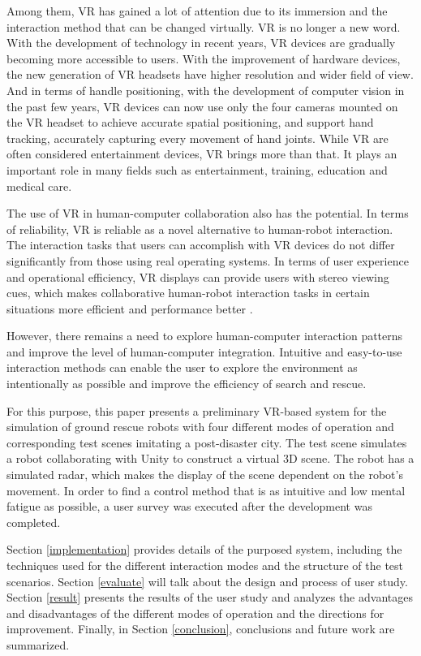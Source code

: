 Among them, VR has gained a lot of attention due to its immersion and the interaction method that can be changed virtually. VR is no longer a new word. With the development of technology in recent years, VR devices are gradually becoming more accessible to users. With the improvement of hardware devices, the new generation of VR headsets have higher resolution and wider field of view. And in terms of handle positioning, with the development of computer vision in the past few years, VR devices can now use only the four cameras mounted on the VR headset to achieve accurate spatial positioning, and support hand tracking, accurately capturing every movement of hand joints. While VR are often considered entertainment devices, VR brings more than that. It plays an important role in many fields such as entertainment, training, education and medical care.

The use of VR in human-computer collaboration also has the potential. In terms of reliability, VR is reliable as a novel alternative to human-robot interaction. The interaction tasks that users can accomplish with VR devices do not differ significantly from those using real operating systems\cite{Villani:2018ub}. In terms of user experience and operational efficiency, VR displays can provide users with stereo viewing cues, which makes collaborative human-robot interaction tasks in certain situations more efficient and performance better \cite{Liu:2017tw}.

However, there remains a need to explore human-computer interaction patterns and improve the level of human-computer integration\cite{Wang:2017uy}. Intuitive and easy-to-use interaction methods can enable the user to explore the environment as intentionally as possible and improve the efficiency of search and rescue.

For this purpose, this paper presents a preliminary VR-based system for the simulation of ground rescue robots with four different modes of operation and corresponding test scenes imitating a post-disaster city. The test scene simulates a robot collaborating with Unity to construct a virtual 3D scene. The robot has a simulated radar, which makes the display of the scene dependent on the robot's movement.
In order to find a control method that is as intuitive and low mental fatigue as possible, a user survey was executed after the development was completed.



Section \ref{implementation} provides details of the purposed system, including the techniques used for the different interaction modes and the structure of the test scenarios.
Section \ref{evaluate} will talk about the design and process of user study.
Section \ref{result} presents the results of the user study and analyzes the advantages and disadvantages of the different modes of operation and the directions for improvement.
Finally, in Section \ref{conclusion}, conclusions and future work are summarized.


